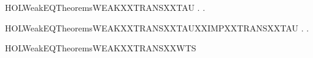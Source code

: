 \newcommand{\HOLWeakEQTheoremsWEAKXXTRANSXXSTABLE}{\UseVerbatim{HOLWeakEQTheoremsWEAKXXTRANSXXSTABLE}}
\begin{SaveVerbatim}{HOLWeakEQTheoremsWEAKXXTRANSXXTAU}
\HOLTokenTurnstile{} \HOLSymConst{\HOLTokenForall{}} .  \HOLTokenWeakTransBegin\HOLConst{\ensuremath{\tau}}\HOLTokenWeakTransEnd {} \HOLSymConst{\HOLTokenEquiv{}} \HOLSymConst{\HOLTokenExists{}}.  \HOLTokenTransBegin\HOLConst{\ensuremath{\tau}}\HOLTokenTransEnd {} \HOLSymConst{\HOLTokenConj{}}   
\end{SaveVerbatim}
\newcommand{\HOLWeakEQTheoremsWEAKXXTRANSXXTAU}{\UseVerbatim{HOLWeakEQTheoremsWEAKXXTRANSXXTAU}}
\begin{SaveVerbatim}{HOLWeakEQTheoremsWEAKXXTRANSXXTAUXXIMPXXTRANSXXTAU}
\HOLTokenTurnstile{} \HOLSymConst{\HOLTokenForall{}} .  \HOLTokenWeakTransBegin\HOLConst{\ensuremath{\tau}}\HOLTokenWeakTransEnd {} \HOLSymConst{\HOLTokenImp{}} \HOLSymConst{\HOLTokenExists{}}.  \HOLTokenTransBegin\HOLConst{\ensuremath{\tau}}\HOLTokenTransEnd {} \HOLSymConst{\HOLTokenConj{}}   
\end{SaveVerbatim}
\newcommand{\HOLWeakEQTheoremsWEAKXXTRANSXXTAUXXIMPXXTRANSXXTAU}{\UseVerbatim{HOLWeakEQTheoremsWEAKXXTRANSXXTAUXXIMPXXTRANSXXTAU}}
\begin{SaveVerbatim}{HOLWeakEQTheoremsWEAKXXTRANSXXWTS}
\HOLTokenTurnstile{}  \HOLSymConst{\ensuremath{=}}   \HOLConst{\ensuremath{\tau}}
\end{SaveVerbatim}
\newcommand{\HOLWeakEQTheoremsWEAKXXTRANSXXWTS}{\UseVerbatim{HOLWeakEQTheoremsWEAKXXTRANSXXWTS}}
